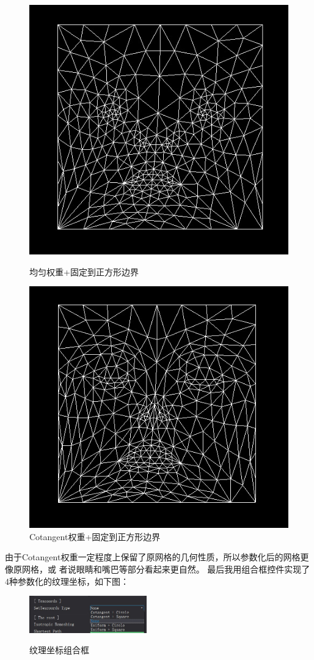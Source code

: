 \documentclass{article}
\begin{document}
	\begin{figure}[htbp]
		\centering
		\begin{minipage}{0.49\linewidth}
			\centering
			\includegraphics[width=0.7\linewidth]{US.JPG}
			\caption{均匀权重+固定到正方形边界}
		\end{minipage}
		\begin{minipage}{0.49\linewidth}
			\centering
			\includegraphics[width=0.7\linewidth]{CS.JPG}
			\caption{Cotangent权重+固定到正方形边界}
		\end{minipage}
	\end{figure}
	由于Cotangent权重一定程度上保留了原网格的几何性质，所以参数化后的网格更像原网格，或
	者说眼睛和嘴巴等部分看起来更自然。
	\clearpage
	最后我用组合框控件实现了4种参数化的纹理坐标，如下图：
	\begin{figure}[htb]
		\caption{\label{table.label} 纹理坐标组合框} \centering
		\begin{center}
			\includegraphics[width=2in]{texcoords.jpg}
			\label{figure.label}
		\end{center}
	\end{figure}
\end{document}
